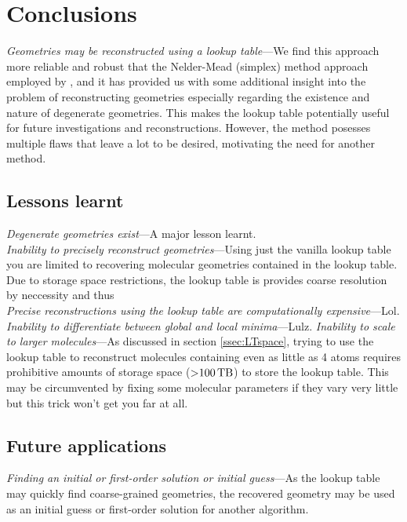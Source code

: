 \begin{figure}
  \label{fig:DegenerateGeometryTrajectories}
\end{figure}

\section{Conclusions}
\emph{Geometries may be reconstructed using a lookup table}---We find this approach more reliable and robust that the Nelder-Mead (simplex) method approach employed by \citet{Brichta09}, and it has provided us with some additional insight into the problem of reconstructing geometries especially regarding the existence and nature of degenerate geometries. This makes the lookup table potentially useful for future investigations and reconstructions. However, the method posesses multiple flaws that leave a lot to be desired, motivating the need for another method.

\subsection{Lessons learnt}
\emph{Degenerate geometries exist}---A major lesson learnt. \\
\emph{Inability to precisely reconstruct geometries}---Using just the vanilla lookup table you are limited to recovering molecular geometries contained in the lookup table. Due to storage space restrictions, the lookup table is provides coarse resolution by neccessity and thus \\

\emph{Precise reconstructions using the lookup table are computationally expensive}---Lol.
\emph{Inability to differentiate between global and local minima}---Lulz.
\emph{Inability to scale to larger molecules}---As discussed in section \ref{ssec:LTspace}, trying to use the lookup table to reconstruct molecules containing even as little as 4 atoms requires prohibitive amounts of storage space ($\SI{>100}{\tera\byte}$) to store the lookup table. This may be circumvented by fixing some molecular parameters if they vary very little but this trick won't get you far at all.

\subsection{Future applications}

\emph{Finding an initial or first-order solution or initial guess}---As the lookup table may quickly find coarse-grained geometries, the recovered geometry may be used as an initial guess or first-order solution for another algorithm. \\

